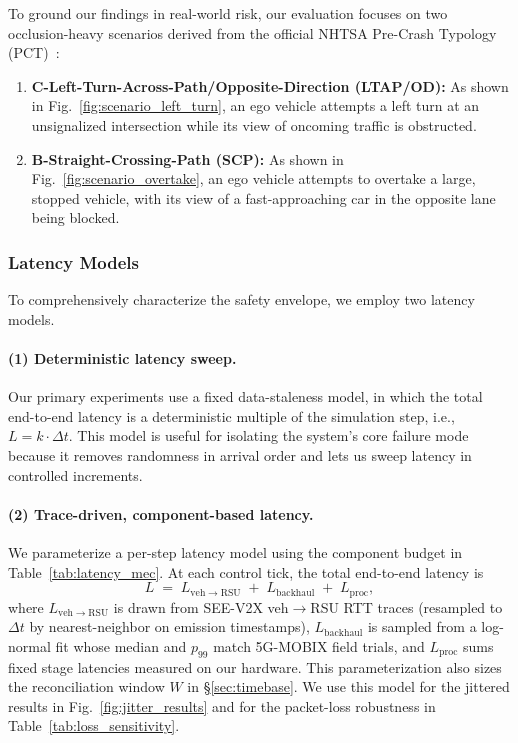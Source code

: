To ground our findings in real-world risk, our evaluation focuses on two occlusion-heavy scenarios derived from the official NHTSA Pre-Crash Typology (PCT)~\cite{NHTSA_Typology}:
\begin{enumerate}[label=\arabic*.,noitemsep,topsep=0pt,leftmargin=1.2\parindent]
    \item \textbf{C-Left-Turn-Across-Path/Opposite-Direction (LTAP/OD):} As shown in Fig.~\ref{fig:scenario_left_turn}, an ego vehicle attempts a left turn at an unsignalized intersection while its view of oncoming traffic is obstructed.
    \item \textbf{B-Straight-Crossing-Path (SCP):} As shown in Fig.~\ref{fig:scenario_overtake}, an ego vehicle attempts to overtake a large, stopped vehicle, with its view of a fast-approaching car in the opposite lane being blocked.
\end{enumerate}










\subsubsection{Latency Models}
\label{sec:e2e_lat_model}
To comprehensively characterize the safety envelope, we employ two latency models.

\paragraph{(1) Deterministic latency sweep.}
Our primary experiments use a fixed data-staleness model, in which the total end-to-end latency is a deterministic multiple of the simulation step, i.e., \(L = k \cdot \Delta t\).
This model is useful for isolating the system's core failure mode because it removes randomness in arrival order and lets us sweep latency in controlled increments.

\paragraph{(2) Trace-driven, component-based latency.}
We parameterize a per-step latency model using the component budget in Table~\ref{tab:latency_mec}. At each control tick, the total end-to-end latency is
\[
L \;=\; L_{\mathrm{veh}\rightarrow\mathrm{RSU}} \;+\; L_{\mathrm{backhaul}} \;+\; L_{\mathrm{proc}},
\]
where $L_{\mathrm{veh}\rightarrow\mathrm{RSU}}$ is drawn from SEE-V2X veh$\rightarrow$RSU RTT traces (resampled to $\Delta t$ by nearest-neighbor on emission timestamps), $L_{\mathrm{backhaul}}$ is sampled from a log-normal fit whose median and $p_{99}$ match 5G-MOBIX field trials, and $L_{\mathrm{proc}}$ sums fixed stage latencies measured on our hardware. This parameterization also sizes the reconciliation window $W$ in §\ref{sec:timebase}. We use this model for the jittered results in Fig.~\ref{fig:jitter_results} and for the packet-loss robustness in Table~\ref{tab:loss_sensitivity}.

